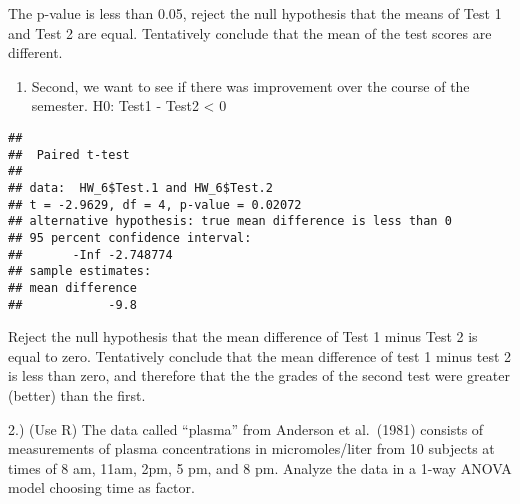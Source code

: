 \documentclass[
]{article}
\newenvironment{Shaded}{\begin{snugshade}}{\end{snugshade}}
\newcommand{\AttributeTok}[1]{\textcolor[rgb]{0.13,0.29,0.53}{#1}}
\newcommand{\ConstantTok}[1]{\textcolor[rgb]{0.56,0.35,0.01}{#1}}
\newcommand{\FloatTok}[1]{\textcolor[rgb]{0.00,0.00,0.81}{#1}}
\newcommand{\FunctionTok}[1]{\textcolor[rgb]{0.13,0.29,0.53}{\textbf{#1}}}
\newcommand{\NormalTok}[1]{#1}
\newcommand{\OtherTok}[1]{\textcolor[rgb]{0.56,0.35,0.01}{#1}}
\newcommand{\SpecialCharTok}[1]{\textcolor[rgb]{0.81,0.36,0.00}{\textbf{#1}}}
\newcommand{\StringTok}[1]{\textcolor[rgb]{0.31,0.60,0.02}{#1}}
\providecommand{\tightlist}{%
  \setlength{\itemsep}{0pt}\setlength{\parskip}{0pt}}
\begin{document}
The p-value is less than 0.05, reject the null hypothesis that the means
of Test 1 and Test 2 are equal. Tentatively conclude that the mean of
the test scores are different.

\begin{enumerate}
\def\labelenumi{\alph{enumi}.}
\setcounter{enumi}{1}
\tightlist
\item
  Second, we want to see if there was improvement over the course of the
  semester. H0: Test1 - Test2 \textless{} 0
\end{enumerate}

\begin{Shaded}
\end{Shaded}

\begin{verbatim}
## 
##  Paired t-test
## 
## data:  HW_6$Test.1 and HW_6$Test.2
## t = -2.9629, df = 4, p-value = 0.02072
## alternative hypothesis: true mean difference is less than 0
## 95 percent confidence interval:
##       -Inf -2.748774
## sample estimates:
## mean difference 
##            -9.8
\end{verbatim}

Reject the null hypothesis that the mean difference of Test 1 minus Test
2 is equal to zero. Tentatively conclude that the mean difference of
test 1 minus test 2 is less than zero, and therefore that the the grades
of the second test were greater (better) than the first.

2.) (Use R) The data called ``plasma'' from Anderson et al.~(1981)
consists of measurements of plasma concentrations in micromoles/liter
from 10 subjects at times of 8 am, 11am, 2pm, 5 pm, and 8 pm. Analyze
the data in a 1-way ANOVA model choosing time as factor.

\begin{Shaded}
\end{Shaded}
\end{document}
